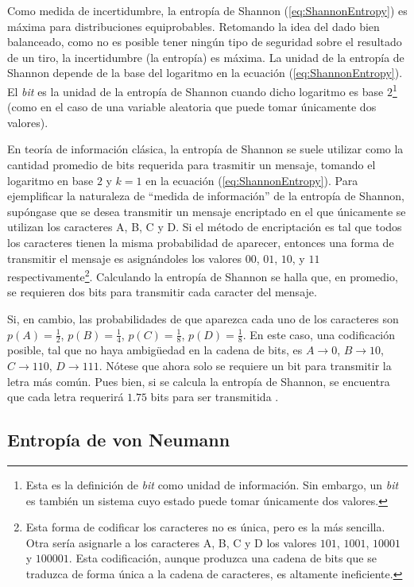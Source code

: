 Como medida de incertidumbre, la entropía de Shannon (\ref{eq:ShannonEntropy}) es máxima para distribuciones equiprobables. Retomando la idea del dado bien balanceado, como no es posible tener ningún tipo de seguridad sobre el resultado de un tiro, la incertidumbre (la entropía) es máxima. La unidad de la entropía de Shannon depende de la base del logaritmo en la ecuación (\ref{eq:ShannonEntropy}). El \textit{bit} es la unidad de la entropía de Shannon cuando dicho logaritmo es base $2$\footnote{Esta es la definición de \textit{bit} como unidad de información. Sin embargo, un \textit{bit} es también un sistema cuyo estado puede tomar únicamente dos valores.} (como en el caso de una variable aleatoria que puede tomar únicamente dos valores).


En teoría de información clásica, la entropía de Shannon se suele utilizar como la cantidad promedio de bits requerida para trasmitir un mensaje, tomando el logaritmo en base $2$ y $k=1$ en la ecuación (\ref{eq:ShannonEntropy}). Para ejemplificar la naturaleza de ``medida de información'' de la entropía de Shannon, supóngase que se desea transmitir un mensaje encriptado en el que únicamente se utilizan los caracteres A, B, C y D. Si el método de encriptación es tal que todos los caracteres tienen la misma probabilidad de aparecer, entonces una forma de transmitir el mensaje es asignándoles los valores $00$, $01$, $10$, y $11$ respectivamente\footnote{Esta forma de codificar los caracteres no es única, pero es la más sencilla. Otra sería asignarle a los caracteres A, B, C y D los valores $101$, $1001$, $10001$ y $100001$. Esta codificación, aunque produzca una cadena de bits que se traduzca de forma única a la cadena de caracteres, es altamente ineficiente. }. Calculando la entropía de Shannon se halla que, en promedio, se requieren dos bits para transmitir cada caracter del mensaje. 

Si, en cambio, las probabilidades de que aparezca cada uno de los caracteres son $p(A)=\frac{1}{2}$, $p(B)=\frac{1}{4}$, $p(C)=\frac{1}{8}$, $p(D)=\frac{1}{8}$. En este caso, una codificación posible, tal que no haya ambigüedad en la cadena de bits, es $A \rightarrow 0$, $B\rightarrow 10$, $C\rightarrow 110$, $D\rightarrow 111$. Nótese que ahora solo se requiere un bit para transmitir la letra más común. Pues bien, si se calcula la entropía de Shannon, se encuentra que cada letra requerirá $1.75$ bits para ser transmitida \cite{Cryptography}.

\subsection{Entropía de von Neumann}

